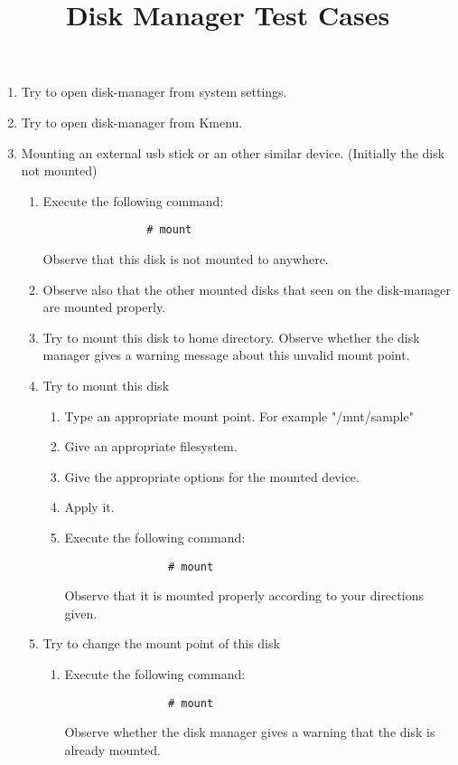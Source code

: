 \documentclass[a4paper,10pt]{article}
\title{Disk Manager Test Cases}
\begin{document}
\maketitle
\begin{enumerate}

\item Try to open disk-manager from system settings.
\item Try to open disk-manager from Kmenu.

\item Mounting an external usb stick or an other similar device. (Initially the disk not mounted) 
    \begin{enumerate}
        \item Execute the following command:
            \begin{verbatim}
                # mount
            \end{verbatim}
            Observe that this disk is not mounted to anywhere. 

	\item Observe also that the other mounted disks that seen on the disk-manager are mounted properly.  

    \item Try to mount this disk to home directory.
          Observe whether the disk manager gives a warning message about this unvalid mount point.
    \item Try to mount this disk
        \begin{enumerate}
            \item Type an appropriate mount point. For example "/mnt/sample"
            \item Give an appropriate filesystem.
            \item Give the appropriate options for the mounted device.
            \item Apply it.
            \item Execute the following command:
            \begin{verbatim}
                # mount
            \end{verbatim}
                Observe that it is mounted properly according to your directions given.
        \end{enumerate}

    \item Try to change the mount point of this disk
        \begin{enumerate}
            \item Execute the following command:
            \begin{verbatim}
                # mount
            \end{verbatim}
            Observe whether the disk manager gives a warning that the disk is already mounted.
        \end{enumerate}


\end{enumerate}
\end{enumerate}
\end{document}
